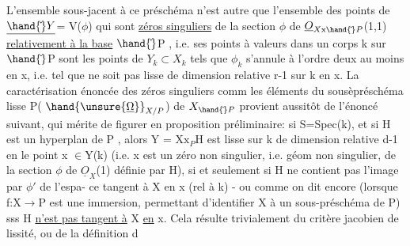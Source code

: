 
L'ensemble sous-jacent à ce préschéma n'est autre que l'ensemble des
points de $\underline{\hand{\check{}}Y}$= V($\phi$) qui sont \uline{zéros singuliers} de la section $\phi$ de
$\underline{O}_{X\mathrm{x}\hand{\check{}}P}$(1,1) \uline{relativement à la base} $\hand{\check{}}$P , i.e. ses points  à valeurs dans
un corps k sur $\hand{\check{}}$P sont les points  de $Y_k\subset X_k$ tels que 
 $\phi_k$ s'annule à l'ordre deux au moins
en x, i.e. tel que  ne soit pas lisse de dimension relative r-1
sur k en x. La caractérisation énoncée des  zéros singuliers comm
les éléments du sousèpréschéma lisse P( $\hand{\unsure{\underline{\Omega}}}_{X/P}$) de $X_{\hand{\check{}}P}$ provient aussitôt
de l'énoncé suivant, qui mérite de figurer en proposition préliminaire:
si S=Spec(k), et si H est un hyperplan de P , alors Y = X$\mathrm{x}_P$H est
 lisse sur k de
dimension relative d-1 en le point x $\in$Y(k) (i.e. x est un zéro non
singulier, i.e. géom non singulier, de la section $\phi$ de $\underline{O}_X$(1) définie
par H), si et seulement si H ne contient pas l'image par $\phi'$ de l'espa-%
ce tangent à X en x (rel à k) - ou  comme on dit encore
(lorsque f:X$\longrightarrow$P est une immersion, permettant d'identifier X à un
sous-préschéma de P) sss H \uline{n'est pas tangent à} X \uline{en} x. Cela résulte
trivialement du critère jacobien de lissité, ou de la définition d

